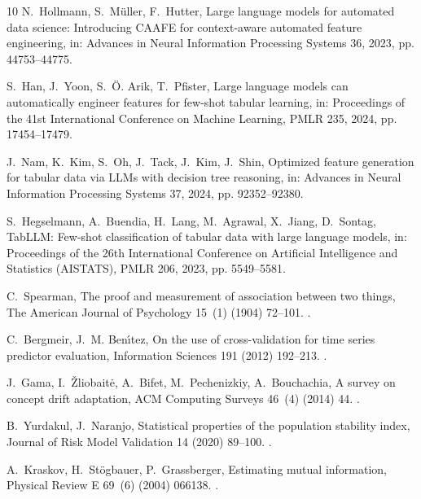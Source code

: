 \documentclass[final,5p,twocolumn]{elsarticle}
\begin{document}
\begin{thebibliography}{10}
N.~Hollmann, S.~M{\"u}ller, F.~Hutter, Large language models for automated data
  science: Introducing {CAAFE} for context-aware automated feature engineering,
  in: Advances in Neural Information Processing Systems 36, 2023, pp.
  44753--44775.

S.~Han, J.~Yoon, S.~{\"O}. Arik, T.~Pfister, Large language models can
  automatically engineer features for few-shot tabular learning, in: Proceedings
  of the 41st International Conference on Machine Learning, PMLR 235, 2024, pp.
  17454--17479.

J.~Nam, K.~Kim, S.~Oh, J.~Tack, J.~Kim, J.~Shin, Optimized feature generation
  for tabular data via {LLMs} with decision tree reasoning, in: Advances in
  Neural Information Processing Systems 37, 2024, pp. 92352--92380.

S.~Hegselmann, A.~Buendia, H.~Lang, M.~Agrawal, X.~Jiang, D.~Sontag, {TabLLM}:
  Few-shot classification of tabular data with large language models, in:
  Proceedings of the 26th International Conference on Artificial Intelligence
  and Statistics (AISTATS), PMLR 206, 2023, pp. 5549--5581.

C.~Spearman, The proof and measurement of association between two things, The
  American Journal of Psychology 15~(1) (1904) 72--101.
\newblock \href {https://doi.org/10.2307/1412159} {}.

C.~Bergmeir, J.~M. Ben{\'\i}tez, On the use of cross-validation for time series
  predictor evaluation, Information Sciences 191 (2012) 192--213.
\newblock \href {https://doi.org/10.1016/j.ins.2011.12.028}
  {}.

J.~Gama, I.~{\v{Z}}liobait{\.e}, A.~Bifet, M.~Pechenizkiy, A.~Bouchachia, A
  survey on concept drift adaptation, ACM Computing Surveys 46~(4) (2014) 44.
\newblock \href {https://doi.org/10.1145/2523813} {}.

B.~Yurdakul, J.~Naranjo, Statistical properties of the population stability
  index, Journal of Risk Model Validation 14 (2020) 89--100.
\newblock \href {https://doi.org/10.21314/JRMV.2020.227}
  {}.

A.~Kraskov, H.~St{\"o}gbauer, P.~Grassberger, Estimating mutual information,
  Physical Review E 69~(6) (2004) 066138.
\newblock \href {https://doi.org/10.1103/PhysRevE.69.066138}
  {}.


\end{thebibliography}
\end{document}
